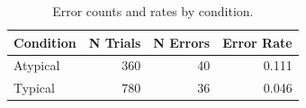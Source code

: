 \begin{table}[htbp]
\centering
\caption{Error counts and rates by condition.}
\label{tab:error-by-condition}
\begin{tabular}{lrrr}
\toprule
Condition & N Trials & N Errors & Error Rate \\
\midrule
Atypical & 360 & 40 & 0.111 \\
Typical & 780 & 36 & 0.046 \\
\bottomrule
\end{tabular}
\end{table}